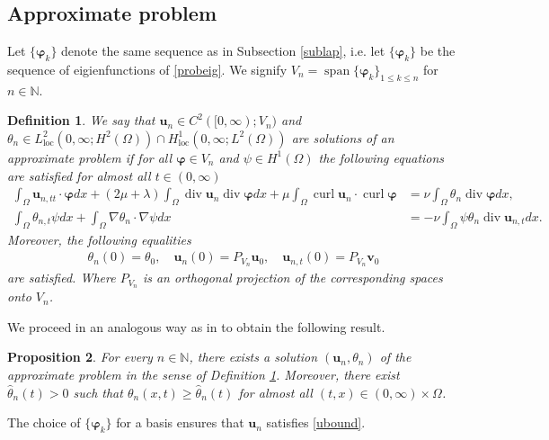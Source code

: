 \documentclass[11pt]{article}
\numberwithin{equation}{section}
\newtheorem{defi}{Definition}[section]
\theoremstyle{plain}
\newtheorem{prop}[defi]{Proposition}
\newcommand\bb[1]{\mathbf{#1}}
\newcommand{\n}{\mathbb{N}}
\newcommand{\tn}{\Omega}
\newcommand{\io}{\int_{\Omega}}
\newcommand{\htwo}{H^2(\Omega)}
\renewcommand{\hom}{H^1(\tn)}
\newcommand{\ld}{L^2(\Omega)}
\newcommand{\loc}{\operatorname{loc}}
\renewcommand{\div}{\operatorname{div}}
\DeclareMathOperator{\curl}{curl}
\let \phi\varphi
\newcommand{\ot}{(0,\infty)\times\Omega}
\newcommand{\wspnd}{2\mu+\lambda}
\newcommand{\bu}{\bb{u}}
\newcommand{\bs}[1]{\boldsymbol{#1}}
\begin{document}
\subsection{Approximate problem}\label{subapp}

Let $\{\bs\phi_k\}$ denote the same sequence as in Subsection \ref{sublap}, i.e. let $\{\bs\phi_k\}$ be the sequence of eigienfunctions of \eqref{probeig}. We signify $V_n=\operatorname{span}\{\bs\phi_k\}_{1\leq k\leq n}$ for $n\in\n$.
\begin{defi}\label{apdef}
We say that $\bb u_n\in C^2([0,\infty);V_n)$ and $\theta_n\in L^2_{\loc}(0,\infty;\htwo)\cap H^1_{\loc}(0,\infty;\ld)$ are solutions of an approximate problem if for all $\bs\phi\in V_n$ and $\psi\in \hom$ the following equations are satisfied for almost all $t\in (0,\infty)$
\begin{align*}
\io \bb{u}_{n,tt}\cdot\bs\phi dx+(\wspnd)\io \div\bb{u}_{n}\div\bs\phi dx+\mu\io\curl\bb{u}_n\cdot\curl\bs\phi&=\nu\io\theta_n\div\bs\phi dx,\\
\io\theta_{n,t}\psi dx+\io \nabla\theta_{n}\cdot\nabla\psi dx&=-\nu\io\psi\theta_n \div \bb{u}_{n,t}dx.
\end{align*}
Moreover, the following equalities
\begin{align*}
\theta_n(0)=\theta_{0},\quad \bb u_n(0)=P_{V_n}\bb u_0,\quad \bb u_{n,t}(0)=P_{V_n}\bb v_0
\end{align*}
are satisfied. Where $P_{V_n}$ is an orthogonal projection of the corresponding spaces onto $V_n$.
\end{defi}
We proceed in an analogous way as in  \cite[Proposition 1 and Lemma 4.2]{CMT} to obtain the following result.
\begin{prop}
For every $n\in\mathbb{N}$, there exists a solution $(\bb u_n,\theta_n)$ of the approximate problem in the sense of Definition \ref{apdef}. Moreover, there exist $\hat\theta_n(t)>0$ such that $\theta_n(x,t)\geq\hat\theta_n(t)$ for almost all $(t,x)\in \ot$.
\end{prop}

The choice of $\{\bs\phi_k\}$ for a basis ensures that $\bu_n$ satisfies \eqref{ubound}.
\end{document}
